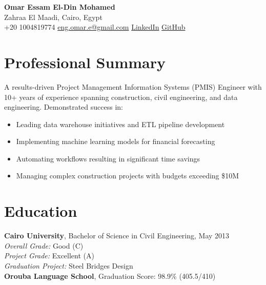 \documentclass[10pt, letterpaper]{article}
\newcommand{\sectionSpacing}{\vspace{1.5ex}}
\begin{document}
\begin{center}
    {\LARGE \textbf{Omar Essam El-Din Mohamed}} \\
    {Zahraa El Maadi, Cairo, Egypt} \\
    {\faPhone* \hspace{0.2cm} +20 1004819774} \hspace{1cm}
    {\href{mailto:eng.omar.e@gmail.com}{\faEnvelope[regular] \hspace{0.2cm} eng.omar.e@gmail.com}} \hspace{1cm}
    {\href{https://www.linkedin.com/in/omar-essam-b602279b}{\faLinkedin \hspace{0.2cm} LinkedIn}} \hspace{1cm}
    {\href{https://github.com/omare32}{\faGithub \hspace{0.2cm} GitHub}}
\end{center}
\sectionSpacing
\section{Professional Summary}
A results-driven Project Management Information Systems (PMIS) Engineer with 10+ years of experience spanning construction, civil engineering, and data engineering. Demonstrated success in:
\begin{itemize}[leftmargin=*, itemsep=0.3ex]
    \item Leading data warehouse initiatives and ETL pipeline development
    \item Implementing machine learning models for financial forecasting
    \item Automating workflows resulting in significant time savings
    \item Managing complex construction projects with budgets exceeding \$10M
\end{itemize}

\section{Education}
\textbf{Cairo University}, Bachelor of Science in Civil Engineering, May 2013 \\
\textit{Overall Grade:} Good (C) \\
\textit{Project Grade:} Excellent (A) \\
\textit{Graduation Project:} Steel Bridges Design \\

\textbf{Orouba Language School}, Graduation Score: 98.9\% (405.5/410)
\end{document}

